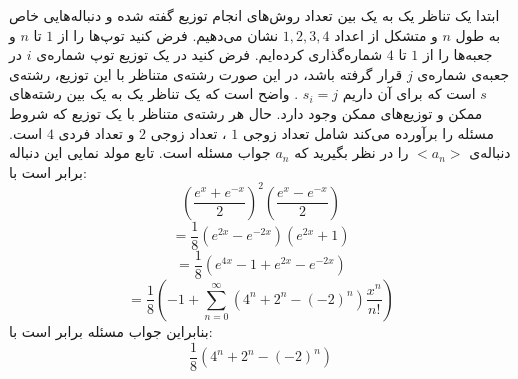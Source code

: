         \p
ابتدا یک تناظر یک به یک بین تعداد روش‌های انجام توزیع گفته شده و دنباله‌هایی خاص به طول
$n$
و متشکل از اعداد
$1, 2, 3, 4$
نشان می‌دهیم. فرض کنید توپ‌ها را از
$1$
تا
$n$
و جعبه‌ها را از
$1$
تا
$4$
شماره‌گذاری کرده‌ایم. فرض کنید در یک توزیع توپ شماره‌ی
$i$
در جعبه‌ی شماره‌ی
$j$
قرار گرفته باشد، در این صورت رشته‌ی متناظر با این توزیع، رشته‌ی
$s$
است که برای آن داریم
$s_i = j$
. واضح است که یک تناظر یک به یک بین رشته‌های ممکن و توزیع‌های ممکن وجود دارد. حال هر رشته‌ی متناظر با یک توزیع که شروط مسئله را برآورده می‌کند شامل تعداد زوجی
$1$
، تعداد زوجی
$2$
و تعداد فردی
$4$
است. دنباله‌ی
$<a_n>$
را در نظر بگیرید که
$a_n$
جواب مسئله است. تابع مولد نمایی این دنباله برابر است با:
$$(\frac{e^x+e^{-x}}{2})^2(\frac{e^x-e^{-x}}{2})$$
$$= \frac{1}{8}(e^{2x} - e^{-2x})(e^{2x}+1)$$
$$= \frac{1}{8}(e^{4x}-1+e^{2x}-e^{-2x})$$
$$= \frac{1}{8}(-1 + \sum_{n=0}^{\infty}(4^n+2^n-(-2)^n)\frac{x^n}{n!})$$
بنابراین جواب مسئله برابر است با:
$$\frac{1}{8}(4^n+2^n-(-2)^n)$$